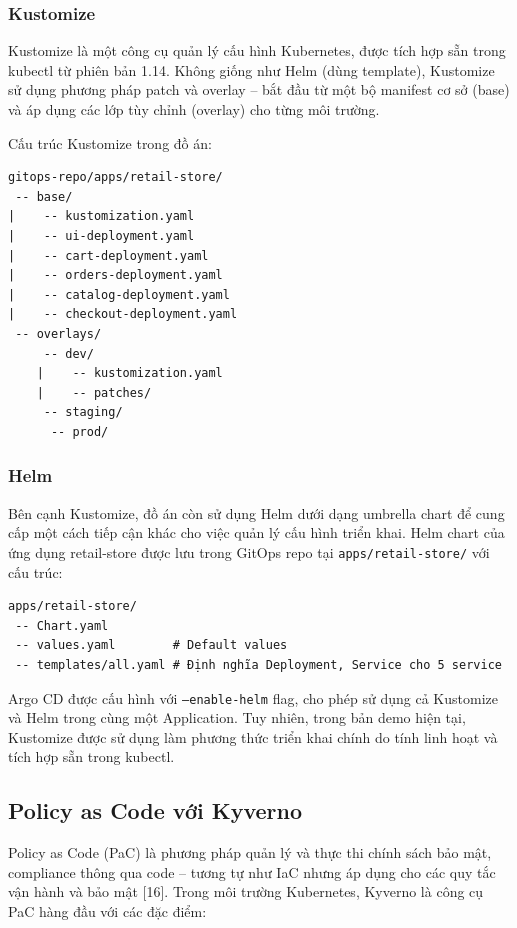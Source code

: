\documentclass[13pt,a4paper,twoside]{extarticle}
\begin{document}
\subsubsection{Kustomize}

Kustomize là một công cụ quản lý cấu hình Kubernetes, được tích hợp sẵn trong kubectl từ phiên bản 1.14. Không giống như Helm (dùng template), Kustomize sử dụng phương pháp patch và overlay -- bắt đầu từ một bộ manifest cơ sở (base) và áp dụng các lớp tùy chỉnh (overlay) cho từng môi trường.

Cấu trúc Kustomize trong đồ án:

\begin{verbatim}
gitops-repo/apps/retail-store/
 -- base/
|    -- kustomization.yaml
|    -- ui-deployment.yaml
|    -- cart-deployment.yaml
|    -- orders-deployment.yaml
|    -- catalog-deployment.yaml
|    -- checkout-deployment.yaml
 -- overlays/
     -- dev/
    |    -- kustomization.yaml
    |    -- patches/
     -- staging/
      -- prod/
\end{verbatim}

\subsubsection{Helm}

Bên cạnh Kustomize, đồ án còn sử dụng Helm dưới dạng umbrella chart để cung cấp một cách tiếp cận khác cho việc quản lý cấu hình triển khai. Helm chart của ứng dụng retail-store được lưu trong GitOps repo tại \texttt{apps/retail-store/} với cấu trúc:

\begin{verbatim}
apps/retail-store/
 -- Chart.yaml
 -- values.yaml        # Default values
 -- templates/all.yaml # Định nghĩa Deployment, Service cho 5 service
\end{verbatim}

Argo CD được cấu hình với \texttt{--enable-helm} flag, cho phép sử dụng cả Kustomize và Helm trong cùng một Application. Tuy nhiên, trong bản demo hiện tại, Kustomize được sử dụng làm phương thức triển khai chính do tính linh hoạt và tích hợp sẵn trong kubectl.

\subsection{Policy as Code với Kyverno}

Policy as Code (PaC) là phương pháp quản lý và thực thi chính sách bảo mật, compliance thông qua code -- tương tự như IaC nhưng áp dụng cho các quy tắc vận hành và bảo mật [16]. Trong môi trường Kubernetes, Kyverno là công cụ PaC hàng đầu với các đặc điểm:
\end{document}
